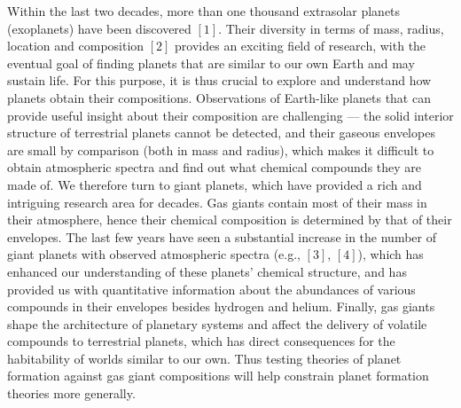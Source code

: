 \documentclass[12pt, letterpaper]{article}
\begin{document}

Within the last two decades, more than one thousand extrasolar planets (exoplanets) have been discovered $[1]$. Their diversity in terms of mass, radius, location and composition $[2]$ provides an exciting field of research, with the eventual goal of finding planets that are similar to our own Earth and may sustain life. For this purpose, it is thus crucial to explore and understand how planets obtain their compositions. Observations of Earth-like planets that can provide useful insight about their composition are challenging --- the solid interior structure of terrestrial planets cannot be detected, and their gaseous envelopes are small by comparison (both in mass and radius), which makes it difficult to obtain atmospheric spectra and find out what chemical compounds they are made of. We therefore turn to giant planets, which have provided a rich and intriguing research area for decades. Gas giants contain most of their mass in their atmosphere, hence their chemical composition is determined by that of their envelopes. The last few years have seen a substantial increase in the number of giant planets with observed atmospheric spectra (e.g., $[3]$, $[4]$), which has enhanced our understanding of these planets' chemical structure, and has provided us with quantitative information about the abundances of various compounds in their envelopes besides hydrogen and helium. Finally, gas giants shape the architecture of planetary systems and affect the delivery of volatile compounds to terrestrial planets, which has direct consequences for the habitability of worlds similar to our own. Thus testing theories of planet formation against gas giant compositions will help constrain planet formation theories more generally.     
\end{document}
